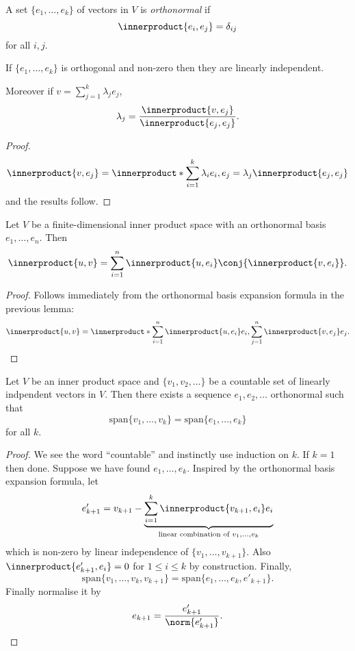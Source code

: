 \documentclass[a4paper]{article}
\newcommand*{\ip}{\innerproduct}
\theoremstyle{definition}
\begin{document}
\begin{definition}[Orthonormality]
  A set \(\{e_1, \dots, e_k\}\) of vectors in \(V\) is \emph{orthonormal} if
  \[
    \ip{e_i, e_j} = \delta_{ij}
  \]
  for all \(i, j\).
\end{definition}

\begin{lemma}
  If \(\{e_1, \dots, e_k\}\) is orthogonal and non-zero then they are linearly independent.

  Moreover if \(v = \sum_{j = 1}^k \lambda_j e_j\),
  \[
    \lambda_j = \frac{\ip{v, e_j}}{\ip{e_j, e_j}}.
  \]
\end{lemma}

\begin{proof}
  \[
    \ip{v, e_j} = \ip*{\sum_{i = 1}^{k} \lambda_ie_i, e_j} = \lambda_j \ip{e_j, e_j}
  \]
  and the results follow.
\end{proof}

\begin{lemma}
  Let \(V\) be a finite-dimensional inner product space with an orthonormal basis \(e_1, \dots, e_n\). Then
  \[
    \ip{u, v} = \sum_{i = 1}^{n}\ip{u, e_i} \conj{\ip{v, e_i}}.
  \]
\end{lemma}

\begin{proof}
  Follows immediately from the orthonormal basis expansion formula in the previous lemma:
  \[
    \ip{u, v} = \ip*{\sum_{i = 1}^n \ip{u, e_i}e_i, \sum_{j = 1}^n \ip{v,e_j}e_j}.
  \]
\end{proof}

\begin{theorem}
  Let \(V\) be an inner product space and \(\{v_1, v_2, \dots \}\) be a countable set of linearly indpendent vectors in \(V\). Then there exists a sequence \(e_1, e_2, \dots\) orthonormal such that
  \[
    \text{span} \{v_1, \dots, v_k\} = \text{span} \{e_1, \dots, e_k\}
  \]
  for all \(k\).
\end{theorem}

\begin{proof}
  We see the word ``countable'' and instinctly use induction on \(k\). If \(k = 1\) then done. Suppose we have found \(e_1, \dots, e_k\). Inspired by the orthonormal basis expansion formula, let
  \[
    e'_{k + 1} = v_{k + 1} - \underbrace{\sum_{i = 1}^k \ip{v_{k + 1}, e_i} e_i}_{\text{linear combination of } v_1, \dots, v_k}
  \]
  which is non-zero by linear independence of \(\{v_1, \dots, v_{k + 1}\}\). Also \(\ip{e'_{k + 1}, e_i} = 0\) for \(1 \leq i \leq k\) by construction. Finally,
\[
  \text{span} \{v_1, \dots, v_k, v_{k + 1}\} = \text{span} \{e_1, \dots, e_k, e'_{k + 1}\}.
\]
Finally normalise it by
\[
  e_{k + 1} = \frac{e'_{k + 1}}{\norm{e'_{k + 1}}}.
\]
\end{proof}
\end{document}
